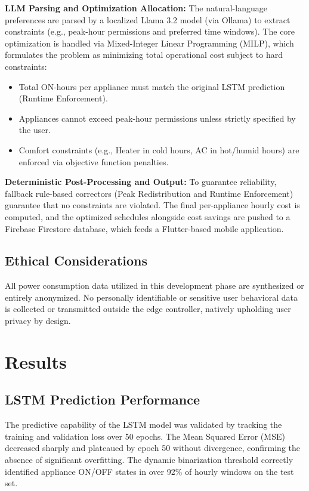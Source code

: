 \documentclass[12pt, a4paper]{article}
\begin{document}
\textbf{LLM Parsing and Optimization Allocation:} The natural-language preferences are parsed by a localized Llama 3.2 model (via Ollama) to extract constraints (e.g., peak-hour permissions and preferred time windows). The core optimization is handled via Mixed-Integer Linear Programming (MILP), which formulates the problem as minimizing total operational cost subject to hard constraints:
\begin{itemize}
    \item Total ON-hours per appliance must match the original LSTM prediction (Runtime Enforcement).
    \item Appliances cannot exceed peak-hour permissions unless strictly specified by the user.
    \item Comfort constraints (e.g., Heater in cold hours, AC in hot/humid hours) are enforced via objective function penalties.
\end{itemize}

\textbf{Deterministic Post-Processing and Output:} To guarantee reliability, fallback rule-based correctors (Peak Redistribution and Runtime Enforcement) guarantee that no constraints are violated. The final per-appliance hourly cost is computed, and the optimized schedules alongside cost savings are pushed to a Firebase Firestore database, which feeds a Flutter-based mobile application.

\subsection{Ethical Considerations}
All power consumption data utilized in this development phase are synthesized or entirely anonymized. No personally identifiable or sensitive user behavioral data is collected or transmitted outside the edge controller, natively upholding user privacy by design.

\section{Results}

\subsection{LSTM Prediction Performance}
The predictive capability of the LSTM model was validated by tracking the training and validation loss over 50 epochs. The Mean Squared Error (MSE) decreased sharply and plateaued by epoch 50 without divergence, confirming the absence of significant overfitting. The dynamic binarization threshold correctly identified appliance ON/OFF states in over 92\% of hourly windows on the test set.
\end{document}
